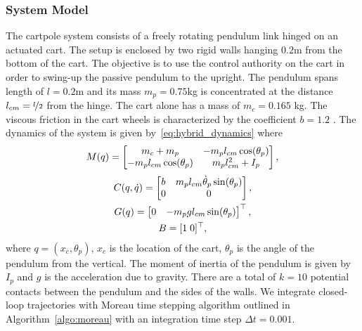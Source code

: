 \subsubsection{System Model}
\label{sssec:cartpole_model}

The cartpole system consists of a freely rotating pendulum link hinged on an
actuated cart.
%
The setup is enclosed by two rigid walls hanging $0.2$m from the bottom of the
cart.
%
The objective is to use the control authority on the cart in order to swing-up
the passive pendulum to the upright.
%
The pendulum spans length of $l=0.2$m and its mass $m_p = 0.75$kg is
concentrated at the distance $l_{cm}=\nicefrac{l}{2}$ from the hinge.
%
The cart alone has a mass of $m_c=0.165$ kg. The viscous friction in the cart
wheels is characterized by the coefficient $b=1.2$ .
%
The dynamics of the system is given by~\eqref{eq:hybrid_dynamics} where 
%
\begin{align*}
    M(q) = \begin{bmatrix}m_c + m_p & -m_p l_{cm} \cos(\theta_p) \\
    -m_pl_{cm}\cos(\theta_p) & m_p l_{cm}^2+I_p\end{bmatrix}, 
\end{align*}
\begin{equation}
    \begin{gathered}
    C(q, \dot{q}) = \begin{bmatrix}b  & m_pl_{cm}\dot{\theta}_p\sin(\theta_p) \\
        0 & 0\end{bmatrix}, \\
    G(q) = \begin{bmatrix}0 & -m_pg l_{cm} \sin(\theta_p)\end{bmatrix}^\top, \\
        B = [1 \; 0]^\top,
    \end{gathered}
\end{equation}
\noindent where $q = (x_c, \theta_p)$, $x_c$ is the location of the cart,
$\theta_p$ is the angle of the pendulum from the vertical. The moment of inertia
of the pendulum is given by $I_p$ and $g$ is the acceleration due to gravity. 
%
There are a total of $k=10$ potential contacts between the pendulum and the sides of
the walls.
%
We integrate closed-loop trajectories with Moreau time stepping algorithm
outlined in Algorithm~\eqref{algo:moreau} with an integration time step $\Delta
t=0.001$.
%

